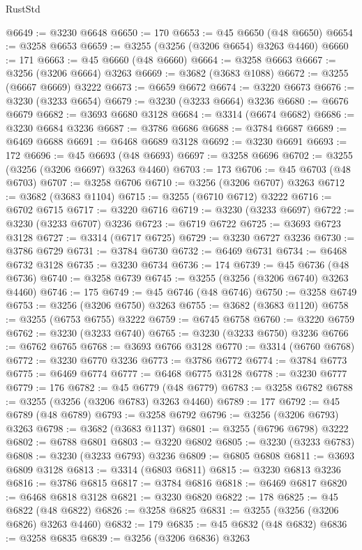 \begin{lexlean}{RustStd}
\begin{coremodule}
@6649 := @3230 @6648
@6650 := 170
@6653 := @45 @6650 (@48 @6650)
@6654 := @3258 @6653
@6659 := @3255 (@3256 (@3206 @6654) @3263 @4460)
@6660 := 171
@6663 := @45 @6660 (@48 @6660)
@6664 := @3258 @6663
@6667 := @3256 (@3206 @6664) @3263
@6669 := @3682 (@3683 @1088)
@6672 := @3255 (@6667 @6669) @3222
@6673 := @6659 @6672
@6674 := @3220 @6673
@6676 := @3230 (@3233 @6654)
@6679 := @3230 (@3233 @6664) @3236
@6680 := @6676 @6679
@6682 := @3693 @6680 @3128
@6684 := @3314 (@6674 @6682)
@6686 := @3230 @6684 @3236
@6687 := @3786 @6686
@6688 := @3784 @6687
@6689 := @6469 @6688
@6691 := @6468 @6689 @3128
@6692 := @3230 @6691
@6693 := 172
@6696 := @45 @6693 (@48 @6693)
@6697 := @3258 @6696
@6702 := @3255 (@3256 (@3206 @6697) @3263 @4460)
@6703 := 173
@6706 := @45 @6703 (@48 @6703)
@6707 := @3258 @6706
@6710 := @3256 (@3206 @6707) @3263
@6712 := @3682 (@3683 @1104)
@6715 := @3255 (@6710 @6712) @3222
@6716 := @6702 @6715
@6717 := @3220 @6716
@6719 := @3230 (@3233 @6697)
@6722 := @3230 (@3233 @6707) @3236
@6723 := @6719 @6722
@6725 := @3693 @6723 @3128
@6727 := @3314 (@6717 @6725)
@6729 := @3230 @6727 @3236
@6730 := @3786 @6729
@6731 := @3784 @6730
@6732 := @6469 @6731
@6734 := @6468 @6732 @3128
@6735 := @3230 @6734
@6736 := 174
@6739 := @45 @6736 (@48 @6736)
@6740 := @3258 @6739
@6745 := @3255 (@3256 (@3206 @6740) @3263 @4460)
@6746 := 175
@6749 := @45 @6746 (@48 @6746)
@6750 := @3258 @6749
@6753 := @3256 (@3206 @6750) @3263
@6755 := @3682 (@3683 @1120)
@6758 := @3255 (@6753 @6755) @3222
@6759 := @6745 @6758
@6760 := @3220 @6759
@6762 := @3230 (@3233 @6740)
@6765 := @3230 (@3233 @6750) @3236
@6766 := @6762 @6765
@6768 := @3693 @6766 @3128
@6770 := @3314 (@6760 @6768)
@6772 := @3230 @6770 @3236
@6773 := @3786 @6772
@6774 := @3784 @6773
@6775 := @6469 @6774
@6777 := @6468 @6775 @3128
@6778 := @3230 @6777
@6779 := 176
@6782 := @45 @6779 (@48 @6779)
@6783 := @3258 @6782
@6788 := @3255 (@3256 (@3206 @6783) @3263 @4460)
@6789 := 177
@6792 := @45 @6789 (@48 @6789)
@6793 := @3258 @6792
@6796 := @3256 (@3206 @6793) @3263
@6798 := @3682 (@3683 @1137)
@6801 := @3255 (@6796 @6798) @3222
@6802 := @6788 @6801
@6803 := @3220 @6802
@6805 := @3230 (@3233 @6783)
@6808 := @3230 (@3233 @6793) @3236
@6809 := @6805 @6808
@6811 := @3693 @6809 @3128
@6813 := @3314 (@6803 @6811)
@6815 := @3230 @6813 @3236
@6816 := @3786 @6815
@6817 := @3784 @6816
@6818 := @6469 @6817
@6820 := @6468 @6818 @3128
@6821 := @3230 @6820
@6822 := 178
@6825 := @45 @6822 (@48 @6822)
@6826 := @3258 @6825
@6831 := @3255 (@3256 (@3206 @6826) @3263 @4460)
@6832 := 179
@6835 := @45 @6832 (@48 @6832)
@6836 := @3258 @6835
@6839 := @3256 (@3206 @6836) @3263

\end{coremodule}
\end{lexlean}
